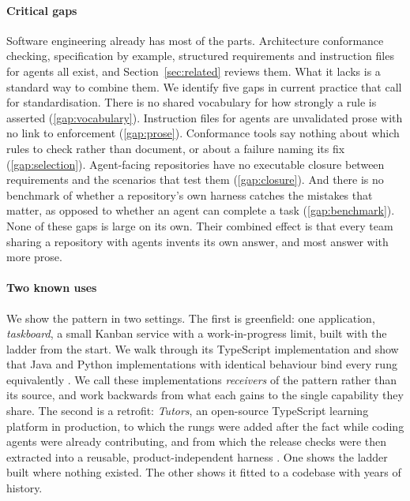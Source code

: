 \paragraph{Critical gaps} Software engineering already has most of the parts. Architecture
conformance checking, specification by example, structured requirements and instruction files
for agents all exist, and Section~\ref{sec:related} reviews them. What it lacks is a standard
way to combine them. We identify five gaps in current practice that call for standardisation.
There is no shared vocabulary for how strongly a rule is asserted (\ref{gap:vocabulary}).
Instruction files for agents are unvalidated prose with no link to enforcement
(\ref{gap:prose}). Conformance tools say nothing about which rules to check rather than
document, or about a failure naming its fix (\ref{gap:selection}). Agent-facing repositories
have no executable closure between requirements and the scenarios that test them
(\ref{gap:closure}). And there is no benchmark of whether a repository's own harness catches
the mistakes that matter, as opposed to whether an agent can complete a task
(\ref{gap:benchmark}). None of these gaps is large on its own. Their combined effect is that
every team sharing a repository with agents invents its own answer, and most answer with more
prose.

\paragraph{Two known uses} We show the pattern in two settings. The first is greenfield:
one application, \emph{taskboard}, a small Kanban service with a work-in-progress limit, built
with the ladder from the start. We walk through its TypeScript implementation and show that
Java and Python implementations with identical behaviour bind every rung equivalently
\citep{taskboardrepo}. We call these implementations \emph{receivers} of the pattern rather
than its source, and work backwards from what each gains to the single capability they share.
The second is a retrofit: \emph{Tutors}, an open-source TypeScript learning platform in
production, to which the rungs were added after the fact while coding agents were already
contributing, and from which the release checks were then extracted into a reusable,
product-independent harness \citep{tutorsmonorepo,tutorsreleaseharness}. One shows the ladder
built where nothing existed. The other shows it fitted to a codebase with years of history.

